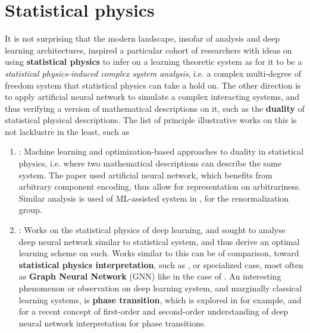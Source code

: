 \chapter{Statistical physics}

It is not surprising that the modern landscape, insofar of analysis and deep learning architectures, inspired a particular cohort of researchers with ideas on using \textbf{statistical physics} to infer on a learning theoretic system as for it to be a \textit{statistical physics-induced complex system analysis}, i.e. a complex multi-degree of freedom system that statistical physics can take a hold on. The other direction is to apply artificial neural network to simulate a complex interacting systems, and thus verifying a version of mathematical descriptions on it, such as the \textbf{duality} of statistical physical descriptions.  The list of principle illustrative works on this is not lacklustre in the least, such as
\begin{enumerate}[topsep=1pt,itemsep=1pt]
    \item \cite{ferrari2024machinelearningoptimizationbasedapproaches}: Machine learning and optimization-based approaches to duality in statistical physics, i.e. where two mathematical descriptions can describe the same system. The paper used artificial neural network, which benefits from arbitrary component encoding, thus allow for representation on arbitrariness. Similar analysis is used of ML-assisted system in \cite{hou2023machinelearningrenormalizationgroup}, for the renormalization group. 
    \item \cite{barbier2025statisticalphysicsdeeplearning}: Works on the statistical physics of deep learning, and sought to analyse deep neural network similar to statistical system, and thus derive an optimal learning scheme on such. Works similar to this can be of comparison, toward \textbf{statistical physics interpretation}, such as \cite{pei2025statisticalphysicsartificialneural,Faulkner_2024}, or specialized case, most often as \textbf{Graph Neural Network} (GNN) like in the case of \cite{Duranthon_2025}. An interesting phenomenon or observation on deep learning system, and marginally classical learning systems, is \textbf{phase transition}, which is explored in \cite{ziyin2022exactphasetransitionsdeep} for example, and \cite{PhysRevResearch.5.043243} for a recent concept of first-order and second-order understanding of deep neural network interpretation for phase transitions. 
\end{enumerate}

